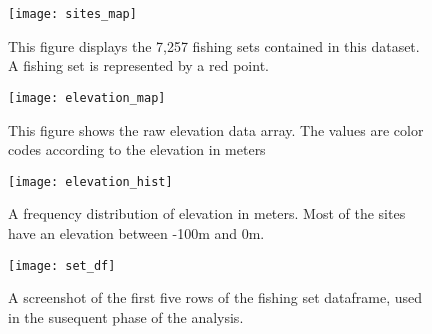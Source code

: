\begin{figure}
    \texttt{[image: sites\_map]}
    \caption{This figure displays the 7,257 fishing sets contained in this dataset. A fishing set is represented by a red point.}
    \label{fig:set_map}
\end{figure}

\begin{figure}
    \texttt{[image: elevation\_map]}
    \caption{This figure shows the raw elevation data array. The values are color codes according to the elevation in meters}
    \label{fig:elevation_map}
\end{figure}

\begin{figure}
    \texttt{[image: elevation\_hist]}
    \caption{A frequency distribution of elevation in meters. Most of the sites have an elevation between -100m and 0m.}
    \label{fig:elevation_hist}
\end{figure}

\begin{figure}
    \texttt{[image: set\_df]}
    \caption{A screenshot of the first five rows of the fishing set dataframe, used in the susequent phase of the analysis.}
    \label{fig:set_df}
\end{figure}